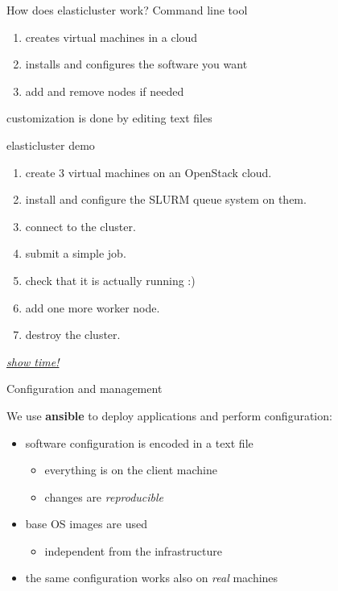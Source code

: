 \documentclass[english,serif,mathserif,usenames,dvipsnames]{beamer}
\begin{document}
\begin{frame}
  {How does elasticluster work?}
  Command line tool
\+
  \begin{enumerate}
  \item creates virtual machines in a cloud
  \item installs and configures the software you want
  \item add and remove nodes if needed
  \end{enumerate}
\+

  customization is done by editing text files
\end{frame}


\begin{frame}
  {elasticluster demo}

  \begin{enumerate}
  \item create 3 virtual machines on an OpenStack cloud.
  \item install and configure the SLURM queue system on them.
  \item connect to the cluster.
  \item submit a simple job.
  \item check that it is actually running :)
  \item add one more worker node.
  \item destroy the cluster.
  \end{enumerate}
  \pause
  \begin{center}
    \href{http://www.youtube.com/watch?v=cR3C7XCSMmArun}{\textit{show time!}}
  \end{center}
\end{frame}

\begin{frame}
  {Configuration and management}

  We use \textbf{ansible} to deploy applications and perform
  configuration:
  \begin{itemize}
  \item software configuration is encoded in a text file
    \begin{itemize}
    \item everything is on the client machine
    \item changes are \textit{reproducible} 
    \end{itemize}
  \item base OS images are used
    \begin{itemize}
    \item independent from the infrastructure
    \end{itemize}
  \item the same configuration works also on \textit{real} machines
  \end{itemize}

\end{frame}
\end{document}
